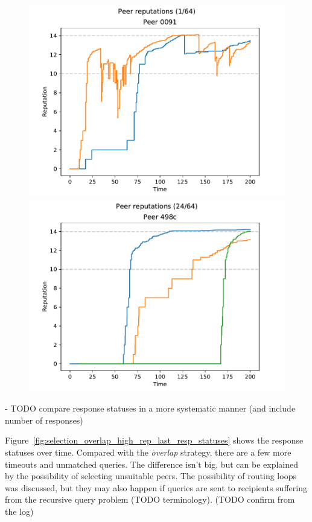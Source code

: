 \begin{figure}[t]
\centering
\includegraphics[width=0.49\columnwidth]{figures/selection_overlap_high_rep_last_peer_reps_1_of_64}
\includegraphics[width=0.49\columnwidth]{figures/selection_overlap_high_rep_last_peer_reps_24_of_64}
\label{fig:selection_overlap_high_rep_last_peer_reps}
\end{figure}

- TODO compare response statuses in a more systematic manner (and include number
  of responses)

Figure~\ref{fig:selection_overlap_high_rep_last_resp_statuses} shows the
response statuses over time. Compared with the \emph{overlap} strategy, there
are a few more timeouts and unmatched queries. The difference isn't big, but can
be explained by the possibility of selecting unsuitable peers. The possibility
of routing loops was discussed, but they may also happen if queries are sent to
recipients suffering from the recursive query problem (TODO terminology). (TODO
confirm from the log)

